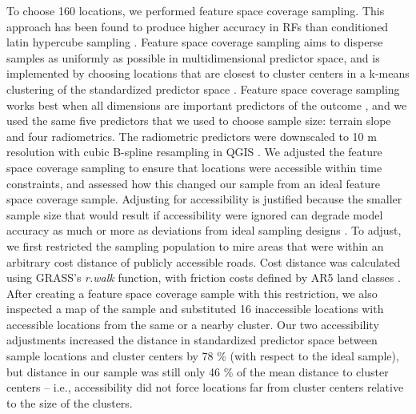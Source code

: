 \documentclass[soil, manuscript]{copernicus}
\begin{document}
To choose 160 locations, we performed feature space coverage sampling.
This approach has been found to produce higher accuracy in RFs than conditioned latin hypercube sampling \citep{wadouxSamplingDesignOptimization2019, maComparisonConditionedLatin2020}.
Feature space coverage sampling aims to disperse samples as uniformly as possible in multidimensional predictor space, and is implemented by choosing locations that are closest to cluster centers in a k-means clustering of the standardized predictor space \citep{brusSamplingDigitalSoil2019}.
Feature space coverage sampling works best when all dimensions are important predictors of the outcome \citep{wadouxSamplingDesignOptimization2019}, and we used the same five predictors that we used to choose sample size: terrain slope and four radiometrics.
The radiometric predictors were downscaled to 10 m resolution with cubic B-spline resampling in QGIS \citep[v.3,][]{QGISsoftware}.
We adjusted the feature space coverage sampling to ensure that locations were accessible within time constraints, and assessed how this changed our sample from an ideal feature space coverage sample.
Adjusting for accessibility is justified because the smaller sample size that would result if accessibility were ignored can degrade model accuracy as much or more as deviations from ideal sampling designs \citep{wadouxSamplingDesignOptimization2019, maComparisonConditionedLatin2020}.
To adjust, we first restricted the sampling population to mire areas that were within an arbitrary cost distance of publicly accessible roads.
Cost distance was calculated using GRASS's \emph{r.walk} function, with friction costs defined by AR5 land classes \citep{GRASSv8-2}.
After creating a feature space coverage sample with this restriction, we also inspected a map of the sample and substituted 16 inaccessible locations with accessible locations from the same or a nearby cluster.
Our two accessibility adjustments increased the distance in standardized predictor space between sample locations and cluster centers by 78 \% (with respect to the ideal sample), but distance in our sample was still only 46 \% of the mean distance to cluster centers -- i.e., accessibility did not force locations far from cluster centers relative to the size of the clusters.
\end{document}
